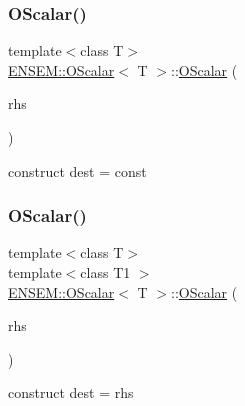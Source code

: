 \subsubsection{\texorpdfstring{OScalar()}{OScalar()}\hspace{0.1cm}{\footnotesize\ttfamily [14/18]}}
{\footnotesize\ttfamily template$<$class T$>$ \\
\mbox{\hyperlink{classENSEM_1_1OScalar}{E\+N\+S\+E\+M\+::\+O\+Scalar}}$<$ T $>$\+::\mbox{\hyperlink{classENSEM_1_1OScalar}{O\+Scalar}} (\begin{DoxyParamCaption}\item[{const typename \mbox{\hyperlink{structENSEM_1_1WordType}{Word\+Type}}$<$ T $>$\+::Type\+\_\+t \&}]{rhs }\end{DoxyParamCaption})\hspace{0.3cm}{\ttfamily [inline]}}



construct dest = const 

\mbox{\label{classENSEM_1_1OScalar_a12d201aefa6cbf8648247fdcc6f08669}} 
\subsubsection{\texorpdfstring{OScalar()}{OScalar()}\hspace{0.1cm}{\footnotesize\ttfamily [15/18]}}
{\footnotesize\ttfamily template$<$class T$>$ \\
template$<$class T1 $>$ \\
\mbox{\hyperlink{classENSEM_1_1OScalar}{E\+N\+S\+E\+M\+::\+O\+Scalar}}$<$ T $>$\+::\mbox{\hyperlink{classENSEM_1_1OScalar}{O\+Scalar}} (\begin{DoxyParamCaption}\item[{const \mbox{\hyperlink{classENSEM_1_1OScalar}{O\+Scalar}}$<$ T1 $>$ \&}]{rhs }\end{DoxyParamCaption})\hspace{0.3cm}{\ttfamily [inline]}}



construct dest = rhs 

\mbox{\label{classENSEM_1_1OScalar_a63525278c1ba085f57cdc4aafe50aaa9}} 
